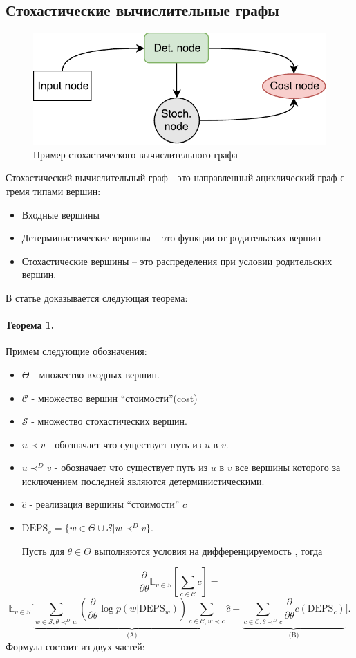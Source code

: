 \documentclass[14pt, a4paper]{extarticle}
\begin{document}
\subsection{Стохастические вычислительные графы}
\begin{figure}[h]
\centering
\includegraphics[width=0.5\linewidth]{scg_example.pdf}
\caption{Пример стохастического вычислительного графа}
\label{fig:scg_example}
\end{figure}
Стохастический вычислительный граф \cite{scg} - это направленный ациклический граф с тремя типами вершин:
\begin{itemize}
  \item Входные вершины
  \item Детерминистические вершины -- это функции от родительских вершин
  \item Стохастические вершины -- это распределения при условии родительских вершин.
\end{itemize}
В статье \cite{scg} доказывается следующая теорема:
\paragraph{Теорема 1.}
Примем следующие обозначения:
\begin{itemize}
  \item $\Theta$ - множество входных вершин.
  \item $\mathcal{C}$ - множество вершин ``стоимости''(cost)
  \item $\mathcal{S}$ - множество стохастических вершин.
  \item $u \prec v$ - обозначает что существует путь из $u$ в $v$.
  \item $u \prec^D v$ - обозначает что существует путь из $u$ в $v$ все вершины которого за исключением последней являются детерминистическими.
  \item $\hat{c}$ - реализация вершины ``стоимости'' $c$
  \item $\textrm{DEPS}_v = \{ w \in \Theta \cup \mathcal{S} | w \prec^D v\}.$
  
  Пусть для $\theta \in \Theta$ выполняются условия на дифференцируемость \cite{scg}, тогда
\end{itemize}
$$
  \frac{\partial}{\partial \theta} \mathbb{E}_{v \in S}\left[\sum_{c \in \mathcal{C}} c\right] =
$$
\begin{equation*}
\mathbb{E}_{v \in S}\Bigg[\underbrace{\sum_{w \in \mathcal{S}, \theta \prec^D w} \left(
\frac{\partial}{\partial \theta} \log p(w|\textrm{DEPS}_w)
\right) \sum_{c \in \mathcal{C}, w \prec c} \hat{c}}_{\textrm{(A)}}
+ \underbrace{\sum_{c \in \mathcal{C}, \theta \prec^D c} \frac{\partial}{\partial \theta}
c(\textrm{DEPS}_c)}_{\textrm{(B)}}\Bigg].
\end{equation*}
Формула состоит из двух частей:
\end{document}
